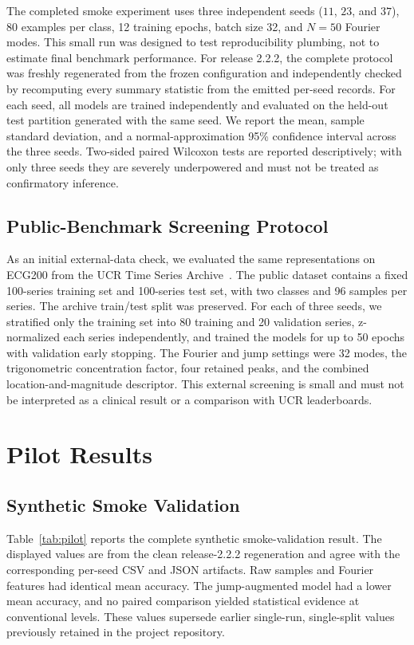 \documentclass[mathematics,article,submit,moreauthors,pdftex]{mdpi}
\begin{document}
The completed smoke experiment uses three independent seeds ($11$, $23$, and $37$), 80 examples per class, 12 training epochs, batch size 32, and $N=50$ Fourier modes. This small run was designed to test reproducibility plumbing, not to estimate final benchmark performance. For release 2.2.2, the complete protocol was freshly regenerated from the frozen configuration and independently checked by recomputing every summary statistic from the emitted per-seed records. For each seed, all models are trained independently and evaluated on the held-out test partition generated with the same seed. We report the mean, sample standard deviation, and a normal-approximation 95\% confidence interval across the three seeds. Two-sided paired Wilcoxon tests are reported descriptively; with only three seeds they are severely underpowered and must not be treated as confirmatory inference.

\subsection{Public-Benchmark Screening Protocol}

As an initial external-data check, we evaluated the same representations on ECG200 from the UCR Time Series Archive~\cite{dau2019ucr}. The public dataset contains a fixed 100-series training set and 100-series test set, with two classes and 96 samples per series. The archive train/test split was preserved. For each of three seeds, we stratified only the training set into 80 training and 20 validation series, z-normalized each series independently, and trained the models for up to 50 epochs with validation early stopping. The Fourier and jump settings were 32 modes, the trigonometric concentration factor, four retained peaks, and the combined location-and-magnitude descriptor. This external screening is small and must not be interpreted as a clinical result or a comparison with UCR leaderboards.

\section{Pilot Results}

\subsection{Synthetic Smoke Validation}

Table~\ref{tab:pilot} reports the complete synthetic smoke-validation result. The displayed values are from the clean release-2.2.2 regeneration and agree with the corresponding per-seed CSV and JSON artifacts. Raw samples and Fourier features had identical mean accuracy. The jump-augmented model had a lower mean accuracy, and no paired comparison yielded statistical evidence at conventional levels. These values supersede earlier single-run, single-split values previously retained in the project repository.
\end{document}
